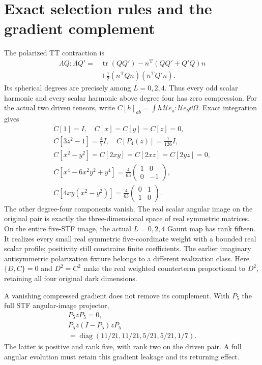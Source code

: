 \section{Exact selection rules and the gradient complement}
The polarized TT contraction is
\[
 \begin{aligned}
 \Lambda Q:\Lambda Q'={}&\operatorname{tr}(QQ')
 -n^{\mathrm T}(QQ'+Q'Q)n\\
 &+\tfrac12(n^{\mathrm T}Qn)(n^{\mathrm T}Q'n).
 \end{aligned}
\]
Its spherical degrees are precisely among $L=0,2,4$. Thus every odd scalar harmonic and every scalar harmonic above degree four has zero compression. For the actual two driven tensors, write $C[h]_{ab}=\int h\,\mathcal Ue_a:\mathcal Ue_b\dd\Omega$. Exact integration gives
\[
\begin{gathered}
 C[1]=I,\quad C[x]=C[y]=C[z]=0,\\
 C[3z^2-1]=\tfrac47I,\quad C[P_4(z)]=\tfrac1{126}I,\\
 C[x^2-y^2]=C[2xy]=C[2xz]=C[2yz]=0,\\
 C[x^4-6x^2y^2+y^4]=\tfrac4{63}\begin{pmatrix}1&0\\0&-1\end{pmatrix},\\
 C[4xy(x^2-y^2)]=\tfrac4{63}\begin{pmatrix}0&1\\1&0\end{pmatrix}.
\end{gathered}
\]
The other degree-four components vanish. The real scalar angular image on the original pair is exactly the three-dimensional space of real symmetric matrices. On the entire five-STF image, the actual $L=0,2,4$ Gaunt map has rank fifteen. It realizes every small real symmetric five-coordinate weight with a bounded real scalar profile; positivity still constrains finite coefficients. The earlier imaginary antisymmetric polarization fixture belongs to a different realization class. Here $\{D,C\}=0$ and $D^2=C^2$ make the real weighted counterterm proportional to $D^2$, retaining all four original dark dimensions.

A vanishing compressed gradient does not remove its complement. With $P_5$ the full STF angular-image projector,
\[
 \begin{gathered}
 P_5zP_5=0,\\
 P_5z(I-P_5)zP_5\\
 =\operatorname{diag}(11/21,11/21,5/21,5/21,1/7).
 \end{gathered}
\]
The latter is positive and rank five, with rank two on the driven pair. A full angular evolution must retain this gradient leakage and its returning effect.


